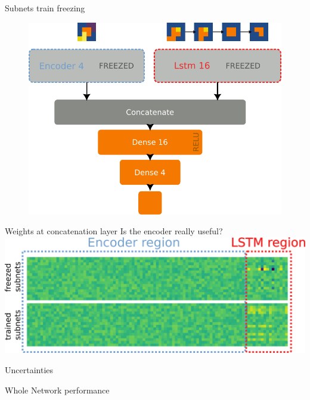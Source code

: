 \documentclass{beamer}
\begin{document}
\begin{frame}{Subnets train freezing}
    \begin{figure}
        \centering
        \includegraphics[width=.8\linewidth]{figures/freezetraining_2.pdf}
    \end{figure}
\end{frame}


\begin{frame}{Weights at concatenation layer}
    \centering
    Is the encoder really useful?
    \vfill
    \includegraphics[width=\linewidth]{figures/weights_comparison.png}
\end{frame}



\begin{frame}{Uncertainties}
    
\end{frame}

\begin{frame}{Whole Network performance}

    
\end{frame}
\end{document}
